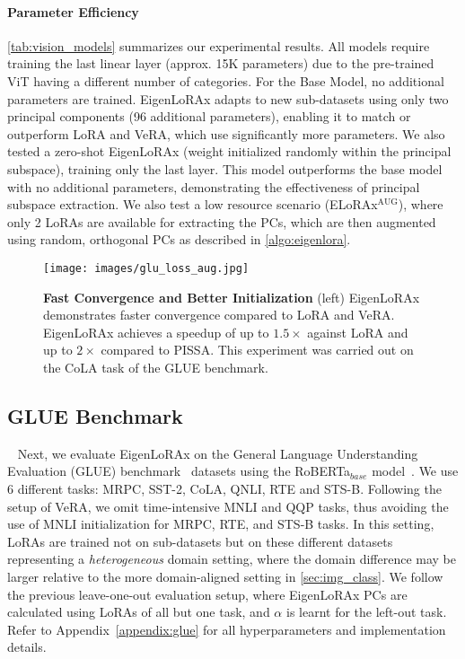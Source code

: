 \paragraph{Parameter Efficiency} \autoref{tab:vision_models} summarizes our experimental results. All models require training the last linear layer (approx. 15K parameters) due to the pre-trained ViT having a different number of categories. For the Base Model, no additional parameters are trained. EigenLoRAx adapts to new sub-datasets using only two principal components (96 additional parameters), enabling it to match or outperform LoRA and VeRA, which use significantly more parameters. We also tested a zero-shot EigenLoRAx (weight initialized randomly within the principal subspace), training only the last layer. This model outperforms the base model with no additional parameters, demonstrating the effectiveness of principal subspace extraction. We also test a low resource scenario (ELoRAx$^{\text{AUG}}$), where only 2 LoRAs are available for extracting the PCs, which are then augmented using random, orthogonal PCs as described in \cref{algo:eigenlora}.
\begin{figure*}[!h]
\label{fig:convergence}
  \centering
  \texttt{[image: images/glu\_loss\_aug.jpg]}
\caption{
\small{\textbf{Fast Convergence and Better Initialization} (left) EigenLoRAx demonstrates faster convergence compared to LoRA and VeRA. EigenLoRAx achieves a speedup of up to $1.5\times$ against LoRA and up to $2\times$ compared to PISSA.
This experiment was carried out on the CoLA task of the GLUE benchmark.}}
\label{fig:traininglosscola}
\end{figure*}
\subsection{GLUE Benchmark}~\label{sec:nlp}
Next, we evaluate EigenLoRAx on the General Language Understanding Evaluation (GLUE) benchmark~\citep{glue} datasets using the RoBERTa$_{base}$ model~\citep{roberta}. We use 6 different tasks: MRPC, SST-2, CoLA, QNLI, RTE and STS-B. Following the setup of VeRA, 
we omit time-intensive MNLI and QQP tasks, thus avoiding the use of MNLI initialization for MRPC, RTE, and STS-B tasks. In this setting, LoRAs are trained not on sub-datasets but on these different datasets representing a \textit{heterogeneous} domain setting, where the domain difference may be larger relative to the more domain-aligned setting in \cref{sec:img_class}. We follow the previous leave-one-out evaluation setup, where EigenLoRAx PCs are calculated using LoRAs of all but one task, and $\alpha$ is learnt for the left-out task. %
Refer to Appendix~\ref{appendix:glue} for all hyperparameters and implementation details.
